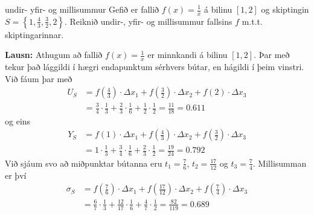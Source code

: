 \begin{syn}{undir- yfir- og millisummur}
Gefið er fallið $f(x) = \frac{1}{x}$ á bilinu $[1,2]$ og skiptingin $S = \left\{1,\frac{4}{3},\frac{3}{2},2\right\}$. Reiknið undir-, yfir- og millisummur fallsins $f$ m.t.t. skiptingarinnar.

\vspace{2mm}

{\bf Lausn:} Athugum að fallið $f(x) = \frac{1}{x}$ er minnkandi á bilinu $[1,2]$. Þar með tekur það lággildi í hægri endapunktum sérhvers bútar, en hágildi í þeim vinstri. Við fáum þar með
\setlength{\jot}{4mm}
\begin{align*}
U_{S} &= f\left(\frac{4}{3}\right)\cdot \Delta x_{1} + f\left(\frac{3}{2}\right)\cdot\Delta x_{2} + f\left(2\right)\cdot \Delta x_{3}\\ &= \frac{3}{4}\cdot\frac{1}{3} + \frac{2}{3}\cdot\frac{1}{6} + \frac{1}{2}\cdot\frac{1}{2} = \frac{11}{18} = 0.611
\end{align*}
og eins
\begin{align*}
Y_{S} &= f\left(1\right)\cdot \Delta x_{1} + f\left(\frac{4}{3}\right)\cdot\Delta x_{2} + f\left(\frac{3}{2}\right)\cdot \Delta x_{3}\\ &= 1\cdot\frac{1}{3}+\frac{3}{4}\cdot\frac{1}{6}+\frac{2}{3}\cdot\frac{1}{2} = \frac{19}{24} = 0.792
\end{align*}
Við sjáum svo að miðpunktar bútanna eru $t_{1} = \frac{7}{6}$, $t_{2} = \frac{17}{12}$ og $t_{3} = \frac{7}{4}$. Millisumman er því
\begin{align*}
\sigma_{S} &= f\left(\frac{7}{6}\right)\cdot\Delta x_{1} + f\left(\frac{17}{12}\right)\cdot\Delta x_{2} + f\left(\frac{7}{4}\right)\cdot\Delta x_{3}\\
&= \frac{6}{7}\cdot\frac{1}{3}+\frac{12}{17}\cdot\frac{1}{6}+\frac{4}{7}\cdot\frac{1}{2} = \frac{82}{119} = 0.689
\end{align*}

\end{syn}

